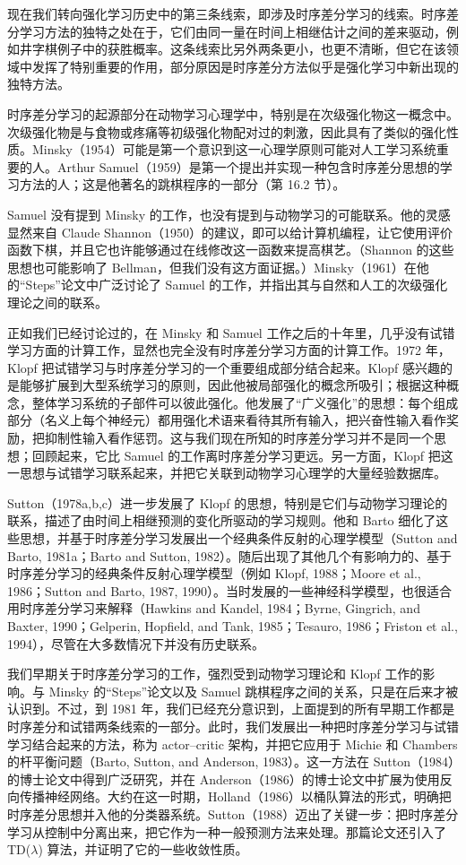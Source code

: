\documentclass[UTF8, 12pt, fontset=fandol, oneside]{ctexart}
\begin{document}
现在我们转向强化学习历史中的第三条线索，即涉及时序差分学习的线索。时序差分学习方法的独特之处在于，它们由同一量在时间上相继估计之间的差来驱动，例如井字棋例子中的获胜概率。这条线索比另外两条更小，也更不清晰，但它在该领域中发挥了特别重要的作用，部分原因是时序差分方法似乎是强化学习中新出现的独特方法。

时序差分学习的起源部分在动物学习心理学中，特别是在次级强化物这一概念中。次级强化物是与食物或疼痛等初级强化物配对过的刺激，因此具有了类似的强化性质。Minsky（1954）可能是第一个意识到这一心理学原则可能对人工学习系统重要的人。Arthur Samuel（1959）是第一个提出并实现一种包含时序差分思想的学习方法的人；这是他著名的跳棋程序的一部分（第 16.2 节）。

Samuel 没有提到 Minsky 的工作，也没有提到与动物学习的可能联系。他的灵感显然来自 Claude Shannon（1950）的建议，即可以给计算机编程，让它使用评价函数下棋，并且它也许能够通过在线修改这一函数来提高棋艺。（Shannon 的这些思想也可能影响了 Bellman，但我们没有这方面证据。）Minsky（1961）在他的“Steps”论文中广泛讨论了 Samuel 的工作，并指出其与自然和人工的次级强化理论之间的联系。

正如我们已经讨论过的，在 Minsky 和 Samuel 工作之后的十年里，几乎没有试错学习方面的计算工作，显然也完全没有时序差分学习方面的计算工作。1972 年，Klopf 把试错学习与时序差分学习的一个重要组成部分结合起来。Klopf 感兴趣的是能够扩展到大型系统学习的原则，因此他被局部强化的概念所吸引；根据这种概念，整体学习系统的子部件可以彼此强化。他发展了“广义强化”的思想：每个组成部分（名义上每个神经元）都用强化术语来看待其所有输入，把兴奋性输入看作奖励，把抑制性输入看作惩罚。这与我们现在所知的时序差分学习并不是同一个思想；回顾起来，它比 Samuel 的工作离时序差分学习更远。另一方面，Klopf 把这一思想与试错学习联系起来，并把它关联到动物学习心理学的大量经验数据库。

Sutton（1978a,b,c）进一步发展了 Klopf 的思想，特别是它们与动物学习理论的联系，描述了由时间上相继预测的变化所驱动的学习规则。他和 Barto 细化了这些思想，并基于时序差分学习发展出一个经典条件反射的心理学模型（Sutton and Barto, 1981a；Barto and Sutton, 1982）。随后出现了其他几个有影响力的、基于时序差分学习的经典条件反射心理学模型（例如 Klopf, 1988；Moore et al., 1986；Sutton and Barto, 1987, 1990）。当时发展的一些神经科学模型，也很适合用时序差分学习来解释（Hawkins and Kandel, 1984；Byrne, Gingrich, and Baxter, 1990；Gelperin, Hopfield, and Tank, 1985；Tesauro, 1986；Friston et al., 1994），尽管在大多数情况下并没有历史联系。

我们早期关于时序差分学习的工作，强烈受到动物学习理论和 Klopf 工作的影响。与 Minsky 的“Steps”论文以及 Samuel 跳棋程序之间的关系，只是在后来才被认识到。不过，到 1981 年，我们已经充分意识到，上面提到的所有早期工作都是时序差分和试错两条线索的一部分。此时，我们发展出一种把时序差分学习与试错学习结合起来的方法，称为 actor--critic 架构，并把它应用于 Michie 和 Chambers 的杆平衡问题（Barto, Sutton, and Anderson, 1983）。这一方法在 Sutton（1984）的博士论文中得到广泛研究，并在 Anderson（1986）的博士论文中扩展为使用反向传播神经网络。大约在这一时期，Holland（1986）以桶队算法的形式，明确把时序差分思想并入他的分类器系统。Sutton（1988）迈出了关键一步：把时序差分学习从控制中分离出来，把它作为一种一般预测方法来处理。那篇论文还引入了 TD($\lambda$) 算法，并证明了它的一些收敛性质。
\end{document}
